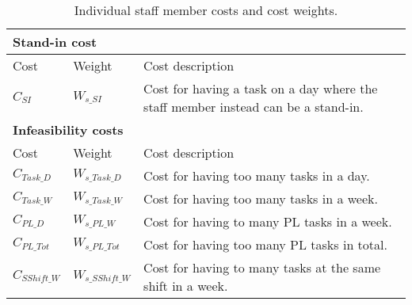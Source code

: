 \begin{table}[!h]
\centering
\caption{Individual staff member costs and cost weights.}
\label{tab:staff member_costs}
\begin{tabular}{|l|l|p{7cm}|}
\hline
\multicolumn{3}{|l|}{\cellcolor{gray!90} \textbf{Stand-in cost}} \\ \hline
\rowcolor{Gray} Cost & Weight & Cost description \\ \hline
$C_{SI}$ & $W_{s\_SI}$ & Cost for having a task on a day where the staff member instead can be a stand-in. \\ \hline
\multicolumn{3}{|l|}{\cellcolor{gray!90} \textbf{Infeasibility costs}} \\ \hline
\rowcolor{Gray} Cost & Weight & Cost description \\ \hline
$C_{Task\_D}$ & $W_{s\_Task\_D}$ & Cost for having too many tasks in a day. \\ \hline
$C_{Task\_W}$ & $W_{s\_Task\_W}$ & Cost for having too many tasks in a week.  \\ \hline
$C_{PL\_D}$ & $W_{s\_PL\_W}$ & Cost for having to many PL tasks in a week. \\ \hline
$C_{PL\_Tot}$ & $W_{s\_PL\_Tot}$ & Cost for having too many PL tasks in total. \\ \hline
$C_{SShift\_W}$ & $W_{s\_SShift\_W}$ & Cost for having to many tasks at the same shift in a week. \\ \hline
\end{tabular}
\end{table}

